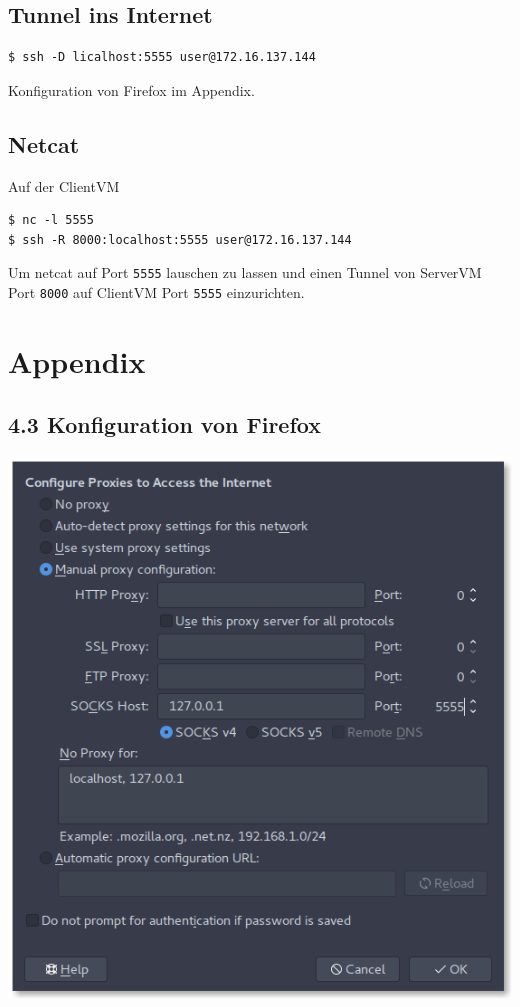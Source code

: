 \documentclass[10pt,a4paper]{article}
\begin{document}
\subsection{Tunnel ins Internet}
\begin{verbatim}
$ ssh -D licalhost:5555 user@172.16.137.144
\end{verbatim}
Konfiguration von Firefox im Appendix.

\subsection{Netcat}
Auf der ClientVM
\begin{verbatim}
$ nc -l 5555
$ ssh -R 8000:localhost:5555 user@172.16.137.144
\end{verbatim}
Um netcat auf Port \texttt{5555} lauschen zu lassen und einen Tunnel von ServerVM Port \texttt{8000} auf ClientVM Port \texttt{5555} einzurichten.


\newpage
\section*{Appendix}
\subsection*{4.3 Konfiguration von Firefox}
\includegraphics[width=\textwidth]{images/image.png}
\end{document}
